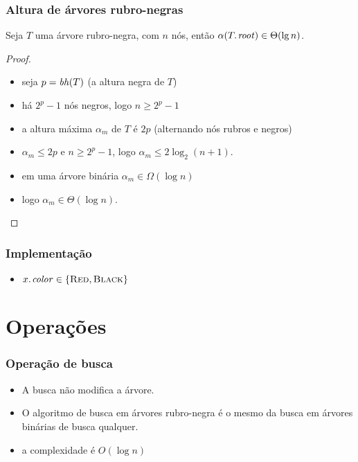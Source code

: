 \documentclass{beamer}
\newcommand{\bh}[0]{\ensuremath{\id{bh}}}
\begin{document}
\begin{frame}
\frametitle{Altura de árvores rubro-negras}

\begin{theorem}
Seja $T$ uma árvore rubro-negra, com $n$ nós, então $\alpha(\attrib{T}{root}) \in \Theta(\lg n)$.
\end{theorem}

\begin{proof}
\begin{itemize}
\item seja $p = \bh(T)$ (a altura negra de $T$)
\item há $2^p - 1$ nós negros, logo $n \ge 2^p - 1$
\item a altura máxima $\alpha_m$ de $T$ é $2p$ (alternando nós rubros e negros)
\item $\alpha_m \le 2p$ e $n \ge 2^p - 1$, logo $\alpha_m \le 2 \log_2 (n+1)$.
\item em uma árvore binária $\alpha_m \in \Omega(\log n)$
\item logo $\alpha_m \in \Theta(\log n)$.
\end{itemize}
\end{proof}

\end{frame}

\begin{frame}

\frametitle{Implementação}

\begin{itemize}
\item $\attrib{x}{color} \in \{\const{Red}, \const{Black} \}$
\end{itemize}

\end{frame}

\section{Operações}

\begin{frame}

\frametitle{Operação de busca}

\begin{itemize}
\item A busca não modifica a árvore.

\item O algoritmo de busca em árvores rubro-negra é o mesmo da busca em árvores
  binárias de busca qualquer.

\item a complexidade é $O(\log n)$

\end{itemize}
\end{frame}
\end{document}
